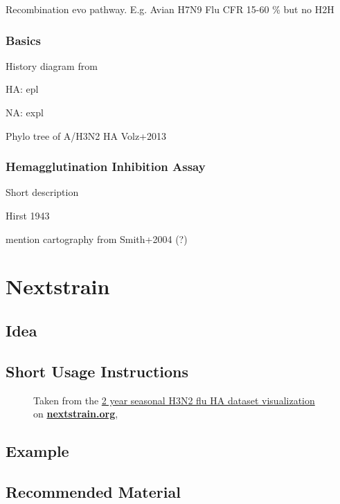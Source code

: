\documentclass[12pt]{scrartcl}
\newcommand{\red}[1]{{\color{red}#1}}
\begin{document}
\red{Recombination evo pathway. E.g. Avian H7N9 Flu CFR 15-60 \% but no H2H}


    \subsubsection{Basics}

      History diagram from \citep{alberts15}

      HA: epl

      NA: expl

      Phylo tree of A/H3N2 HA Volz+2013

    \subsubsection{Hemagglutination Inhibition Assay}

      Short description

      Hirst 1943

      mention cartography from Smith+2004 (?)

\section{Nextstrain} \label{nextstrain}

  \subsection{Idea}

  \subsection{Short Usage Instructions}
  \begin{figure}[h!]
    \caption{\footnotesize Taken from the \href{https://nextstrain.org/flu/seasonal/h3n2/ha/2y?p=grid}{2 year seasonal H3N2 flu HA dataset visualization} on \href{https://nextstrain.org}{\textbf{nextstrain.org}}, \cite{leeMoncla+20}}
  \end{figure}


  \subsection{Example}

  \subsection{Recommended Material}
\end{document}
